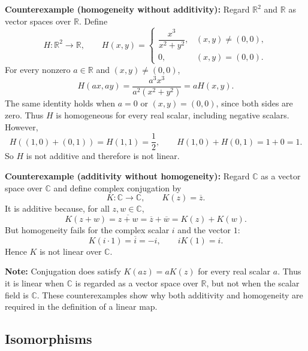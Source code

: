 \documentclass[a4paper,11pt,abstract=true]{scrartcl}
\theoremstyle{dotlessP}
\theoremstyle{dotlessS}
\theoremstyle{remark}
\theoremstyle{definition}
\begin{document}
\begin{claim_box}
\textbf{Counterexample (homogeneity without additivity):} Regard
$\mathbb{R}^2$ and $\mathbb{R}$ as vector spaces over $\mathbb{R}$. Define
\[
H:\mathbb{R}^2\longrightarrow\mathbb{R},
\qquad
H(x,y)=
\begin{cases}
\dfrac{x^3}{x^2+y^2}, & (x,y)\neq(0,0),\\[4pt]
0, & (x,y)=(0,0).
\end{cases}
\]
For every nonzero $a\in\mathbb{R}$ and $(x,y)\neq(0,0)$,
\[
H(ax,ay)=\frac{a^3x^3}{a^2(x^2+y^2)}=aH(x,y).
\]
The same identity holds when $a=0$ or $(x,y)=(0,0)$, since both sides
are zero. Thus $H$ is homogeneous for every real scalar, including
negative scalars. However,
\[
H((1,0)+(0,1))=H(1,1)=\frac12,
\qquad H(1,0)+H(0,1)=1+0=1.
\]
So $H$ is not additive and therefore is not linear.
\end{claim_box}

\begin{claim_box}
\textbf{Counterexample (additivity without homogeneity):} Regard
$\mathbb{C}$ as a vector space over $\mathbb{C}$ and define complex
conjugation by
\[
K:\mathbb{C}\longrightarrow\mathbb{C},
\qquad K(z)=\overline{z}.
\]
It is additive because, for all $z,w\in\mathbb{C}$,
\[
K(z+w)=\overline{z+w}=\overline{z}+\overline{w}=K(z)+K(w).
\]
But homogeneity fails for the complex scalar $i$ and the vector $1$:
\[
K(i\cdot1)=\overline{i}=-i,
\qquad iK(1)=i.
\]
Hence $K$ is not linear over $\mathbb{C}$.
\end{claim_box}

\begin{remark_box}
\textbf{Note:} Conjugation does satisfy
$K(az)=aK(z)$ for every real scalar $a$. Thus it is linear when
$\mathbb{C}$ is regarded as a vector space over $\mathbb{R}$, but not when
the scalar field is $\mathbb{C}$. These counterexamples show why both
additivity and homogeneity are required in the definition of a linear map.
\end{remark_box}



\subsection{Isomorphisms}
\end{document}
